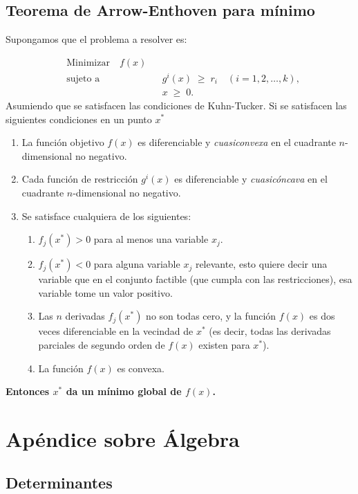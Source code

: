 \documentclass{article}
\begin{document}
\subsection*{Teorema de Arrow-Enthoven para mínimo}
Supongamos que el problema a resolver es:

\[
\begin{aligned}
&\text{Minimizar} \quad f(x) \\
&\text{sujeto a} \quad && g^{i}(x) \;\ge\; r_{i}
\quad (i = 1,2,\dots,k),\\
& && x \;\ge\; 0.
\end{aligned}
\]
Asumiendo que se satisfacen las condiciones de Kuhn-Tucker.
Si se satisfacen las siguientes condiciones en un punto $x^*$
\begin{enumerate}\color{teal}
  \item La función objetivo \(f(x)\) es diferenciable y \emph{cuasiconvexa} en el cuadrante \(n\)-dimensional no negativo.
  \item Cada función de restricción \(g^{i}(x)\) es diferenciable y \emph{cuasicóncava} en el cuadrante \(n\)-dimensional no negativo.
  \item Se satisface cualquiera de los siguientes:
    \begin{enumerate}
      \item \(f_{j}(x^{*}) > 0\) para al menos una variable \(x_{j}\).
      \item \(f_{j}(x^{*}) < 0\) para alguna variable \(x_{j}\) relevante, esto quiere decir una variable que en el conjunto factible (que cumpla con las restricciones), esa variable tome un valor positivo.
      \item Las \(n\) derivadas \(f_{j}(x^{*})\) no son todas cero, y la función \(f(x)\) es dos veces diferenciable en la vecindad de \(x^{*}\) (es decir, todas las derivadas parciales de segundo orden de \(f(x)\) existen para \(x^{*}\)).
      \item La función \(f(x)\) es convexa.
    \end{enumerate}
\end{enumerate}

\textbf{\color{teal}Entonces \(x^{*}\) da un mínimo global de \(f(x)\).
}


\newpage


\section{Apéndice sobre Álgebra}
\subsection*{Determinantes}
\end{document}
